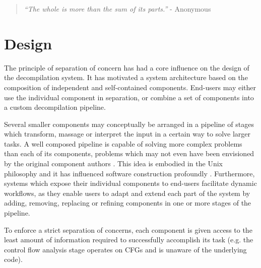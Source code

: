 
%


\begin{quote}
	\textit{``The whole is more than the sum of its parts.''} - Anonymous
\end{quote}

\section{Design}
\label{sec:design}

The principle of separation of concern has had a core influence on the design of the decompilation system. It has motivated a system architecture based on the composition of independent and self-contained components. End-users may either use the individual component in separation, or combine a set of components into a custom decompilation pipeline.

Several smaller components may conceptually be arranged in a pipeline of stages which transform, massage or interpret the input in a certain way to solve larger tasks. A well composed pipeline is capable of solving more complex problems than each of its components, problems which may not even have been envisioned by the original component authors \cite{simplicity_and_collaboration}. This idea is embodied in the Unix philosophy and it has influenced software construction profoundly \cite{art_of_unix}. Furthermore, systems which expose their individual components to end-users facilitate dynamic workflows, as they enable users to adapt and extend each part of the system by adding, removing, replacing or refining
components in one or more stages of the pipeline.

To enforce a strict separation of concerns, each component is given access to the least amount of information required to successfully accomplish its task (e.g. the control flow analysis stage operates on CFGs and is unaware of the underlying code).

